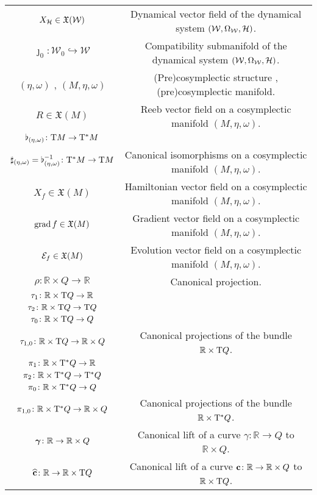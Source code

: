 \documentclass[12pt]{report}
\def\vf{\mathfrak X}
\def\Real{\mathbb{R}}
\def\Tan{{\rm T}}
\begin{document}
\begin{center}
{\begin{tabular}{|c|c|}
$X_{\cal H}\in\vf({\cal W})$ &
Dynamical vector field of the dynamical system $({\cal W},\Omega_{\cal W},{\cal H})$. \\
$\jmath_0\colon\mathcal{W}_0\hookrightarrow\mathcal{W}$ &
Compatibility submanifold of the dynamical system $({\cal W},\Omega_{\cal W},{\cal H})$. \\
$(\eta,\omega)$ , $(M,\eta,\omega)$ & (Pre)cosymplectic structure , (pre)cosymplectic manifold. \\
$R\in\vf(M)$ & Reeb vector field on a cosymplectic manifold $(M,\eta,\omega)$. \\
$\flat_{(\eta,\omega)}\colon\Tan M\to\Tan^*M$ & \\
$\sharp_{(\eta,\omega)}=\flat_{(\eta,\omega)}^{-1}\colon\Tan^* M\to\Tan M$ & Canonical isomorphisms on a cosymplectic manifold $(M,\eta,\omega)$. \\
$X_f\in\vf(M)$ & Hamiltonian vector field on a cosymplectic manifold $(M,\eta,\omega)$. \\
${\rm grad}\,f\in\vf(M)$ & Gradient vector field on a cosymplectic manifold $(M,\eta,\omega)$. \\
${\cal E}_f\in\vf(M)$ & Evolution vector field on a cosymplectic manifold $(M,\eta,\omega)$. \\
$\rho\colon\Real\times Q\to\Real$ & Canonical projection. \\
$\tau_1\colon\Real \times\Tan Q \rightarrow \Real$ & \\
$\tau_2\colon\Real \times \Tan Q \rightarrow \Tan Q$ & \\
$\tau_0\colon\Real \times \Tan Q \rightarrow Q$ & \\
$\tau_{1,0}\colon\Real \times \Tan Q \rightarrow\Real\times Q$ & 
Canonical projections of the bundle $\Real\times\Tan Q$. \\
$\pi_1\colon\Real \times\Tan^*Q \rightarrow \Real$ & \\
$\pi_2\colon\Real \times \Tan^*Q \rightarrow\Tan^*Q$ & \\
$\pi_0\colon\Real \times \Tan^*Q \rightarrow Q$ & \\
$\pi_{1,0}\colon\Real \times \Tan^*Q \rightarrow\Real\times Q$ & 
Canonical projections of the bundle $\Real\times\Tan^*Q$. \\
$\mbox{\boldmath$\gamma$}\colon\Real \to\Real\times Q$ & 
Canonical lift of a curve $\gamma\colon\Real \to  Q$ to $\Real\times Q$.  \\
$\widehat{\bf c} \colon\Real  \to\Real\times \Tan Q$ &
Canonical lift of a curve ${\bf c}\colon\Real \to\Real\times Q$ to $\Real\times\Tan Q$.  \\

\end{tabular}}
\end{center}
\end{document}
